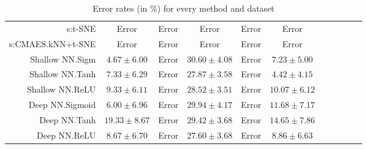 \begin{table}[ht]
{\begin{tabular}{rcccccccccc}
s:t-SNE & Error  & Error  & Error  & Error  & Error  \\
s:CMAES.kNN+t-SNE & Error  & Error  & Error  & Error  & Error  \\
Shallow NN.Sigm & $\bm{4.67\pm6.00}$ & Error  & $30.60\pm4.08$ & Error  & $7.23\pm5.00$ \\
Shallow NN.Tanh & $7.33\pm6.29$ & Error  & $27.87\pm3.58$ & Error  & $4.42\pm4.15$ \\
Shallow NN.ReLU & $9.33\pm6.11$ & Error  & $28.52\pm3.51$ & Error  & $10.07\pm6.12$ \\
Deep NN.Sigmoid & $6.00\pm6.96$ & Error  & $29.94\pm4.17$ & Error  & $11.68\pm7.17$ \\
Deep NN.Tanh & $19.33\pm8.67$ & Error  & $29.42\pm3.68$ & Error  & $14.65\pm7.86$ \\
Deep NN.ReLU & $8.67\pm6.70$ & Error  & $\bm{27.60\pm3.68}$ & Error  & $8.86\pm6.63$ \\


\bottomrule
\end{tabular}
}
\caption{Error rates (in \%) for every method and dataset} \label{tab:dim-error-rates}
\end{table}
